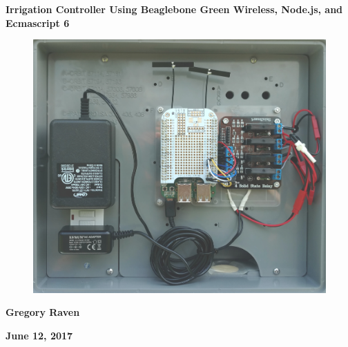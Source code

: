 %
%
%

\thispagestyle{empty}
{\centering\bfseries\color{black}\Huge
Irrigation Controller Using Beaglebone Green Wireless, Node.js, and Ecmascript 6
\par}

\bigskip

\begin{figure}
	\centering
	\includegraphics[width=\textwidth]{photos/cover_photo}
\end{figure}

\bigskip
{\centering\bfseries\Large
Gregory Raven
\par}


\bigskip
{\centering\bfseries\LARGE
June 12, 2017
\par}



